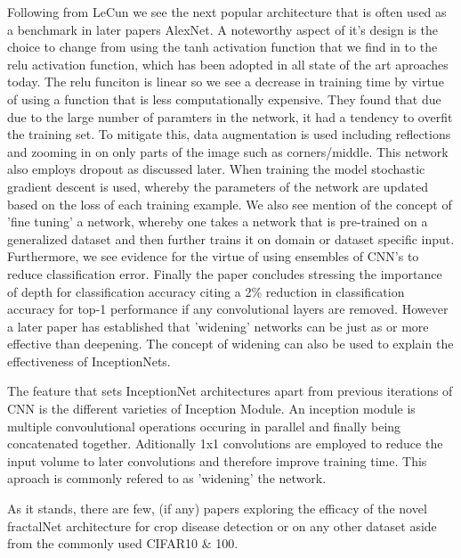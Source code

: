   Following from LeCun we see the next popular architecture that is often used as a benchmark in later papers AlexNet\cite{Krizhevsky}. A noteworthy aspect of it's design is the choice to change from using the tanh activation function that we find in \cite{leCun1998} to the relu activation function, which has been adopted in all state of the art aproaches today. The relu funciton is linear so we see a decrease in training time by virtue of using a function that is less computationally expensive. They found that due due to the large number of paramters in the network, it had a tendency to overfit the training set. To mitigate this, data augmentation is used including reflections and zooming in on only parts of the image such as corners/middle. This network also employs dropout as discussed later. When training the model stochastic gradient descent is used, whereby the parameters of the network are updated based on the loss of each training example. We also see mention of the concept of 'fine tuning' a network, whereby one takes a network that is pre-trained on a generalized dataset and then further trains it on domain or dataset specific input. Furthermore, we see evidence for the virtue of using ensembles of CNN's to reduce classification error. Finally the paper concludes stressing the importance of depth for classification accuracy citing a 2\% reduction in classification accuracy for top-1 performance if any convolutional layers are removed. However a later paper \cite{Zagoruyko} has established that 'widening' networks can be just as or more effective than deepening. The concept of widening can also be used to explain the effectiveness of InceptionNets.
  \par
  The feature that sets InceptionNet architectures apart from previous iterations of CNN is the different varieties of Inception Module. An inception module is multiple convoulutional operations occuring in parallel and finally being concatenated together. Aditionally 1x1 convolutions are employed to reduce the input volume to later convolutions and therefore improve training time. This aproach is commonly refered to as 'widening' the network.
  \par
  As it stands, there are few, (if any) papers exploring the efficacy of the novel fractalNet architecture \cite{Larsson2016} for crop disease detection or on any other dataset aside from the commonly used CIFAR10 \& 100.
  \par
